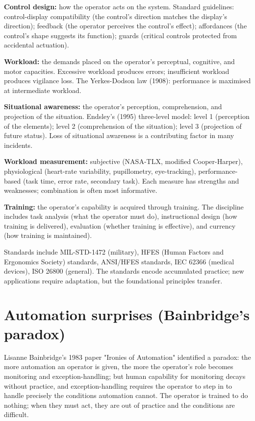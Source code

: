 \textbf{Control design:} how the operator acts on the system. Standard guidelines: control-display compatibility (the control's direction matches the display's direction); feedback (the operator perceives the control's effect); affordances (the control's shape suggests its function); guards (critical controls protected from accidental actuation).

\textbf{Workload:} the demands placed on the operator's perceptual, cognitive, and motor capacities. Excessive workload produces errors; insufficient workload produces vigilance loss. The Yerkes-Dodson law (1908): performance is maximised at intermediate workload.

\textbf{Situational awareness:} the operator's perception, comprehension, and projection of the situation. Endsley's (1995) three-level model: level 1 (perception of the elements); level 2 (comprehension of the situation); level 3 (projection of future status). Loss of situational awareness is a contributing factor in many incidents.

\textbf{Workload measurement:} subjective (NASA-TLX, modified Cooper-Harper), physiological (heart-rate variability, pupillometry, eye-tracking), performance-based (task time, error rate, secondary task). Each measure has strengths and weaknesses; combination is often most informative.

\textbf{Training:} the operator's capability is acquired through training. The discipline includes task analysis (what the operator must do), instructional design (how training is delivered), evaluation (whether training is effective), and currency (how training is maintained).

Standards include MIL-STD-1472 (military), HFES (Human Factors and Ergonomics Society) standards, ANSI/HFES standards, IEC 62366 (medical devices), ISO 26800 (general). The standards encode accumulated practice; new applications require adaptation, but the foundational principles transfer.

\section{Automation surprises (Bainbridge's paradox)}

Lisanne Bainbridge's 1983 paper "Ironies of Automation" identified a paradox: the more automation an operator is given, the more the operator's role becomes monitoring and exception-handling; but human capability for monitoring decays without practice, and exception-handling requires the operator to step in to handle precisely the conditions automation cannot. The operator is trained to do nothing; when they must act, they are out of practice and the conditions are difficult.

